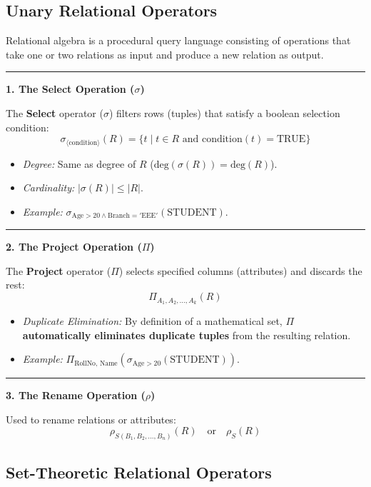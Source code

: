 \documentclass[11pt,a4paper]{article}
\newcommand{\concept}[1]{%
  \vspace{3pt}\noindent\textcolor{AnthGreen}{\rule{3.5pt}{10pt}}\enspace
  \textbf{\sffamily\color{AnthDark}#1}\par\vspace{2pt}%
}
\begin{document}
\subsection{Unary Relational Operators}

Relational algebra is a procedural query language consisting of operations that take one or two relations as input and produce a new relation as output.

\concept{1. The Select Operation ($\sigma$)}
The \textbf{Select} operator ($\sigma$) filters rows (tuples) that satisfy a boolean selection condition:
\begin{equation}
  \sigma_{\langle \text{condition} \rangle}(R) = \{ t \mid t \in R \text{ and } \text{condition}(t) = \text{TRUE} \}
\end{equation}
\begin{itemize}
  \item \emph{Degree:} Same as degree of $R$ ($\text{deg}(\sigma(R)) = \text{deg}(R)$).
  \item \emph{Cardinality:} $|\sigma(R)| \le |R|$.
  \item \emph{Example:} $\sigma_{\text{Age} > 20 \land \text{Branch} = '\text{EEE}'}(\text{STUDENT})$.
\end{itemize}

\concept{2. The Project Operation ($\Pi$)}
The \textbf{Project} operator ($\Pi$) selects specified columns (attributes) and discards the rest:
\begin{equation}
  \Pi_{A_1, A_2, \dots, A_k}(R)
\end{equation}
\begin{itemize}
  \item \emph{Duplicate Elimination:} By definition of a mathematical set, $\Pi$ \textbf{automatically eliminates duplicate tuples} from the resulting relation.
  \item \emph{Example:} $\Pi_{\text{RollNo, Name}}(\sigma_{\text{Age} > 20}(\text{STUDENT}))$.
\end{itemize}

\concept{3. The Rename Operation ($\rho$)}
Used to rename relations or attributes:
\begin{equation}
  \rho_{S(B_1, B_2, \dots, B_n)}(R) \quad \text{or} \quad \rho_S(R)
\end{equation}

\subsection{Set-Theoretic Relational Operators}
\end{document}
